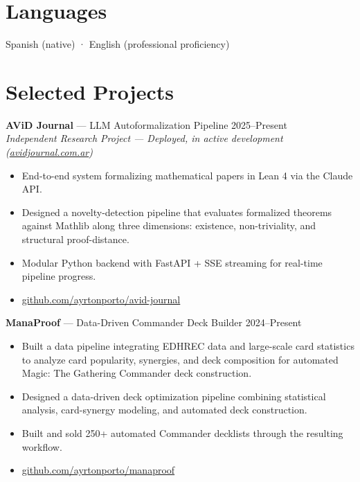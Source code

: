 \documentclass[11pt,a4paper]{article}
\begin{document}
\section{Languages}

Spanish (native) · English (professional proficiency)

\section{Selected Projects}

\textbf{AViD Journal} --- LLM Autoformalization Pipeline \hfill 2025--Present\\
\textit{Independent Research Project --- Deployed, in active development (\href{https://avidjournal.com.ar}{avidjournal.com.ar})}

\begin{itemize}
  \item End-to-end system formalizing mathematical papers in Lean 4 via the Claude API.
  \item Designed a novelty-detection pipeline that evaluates formalized theorems against Mathlib along three dimensions: existence, non-triviality, and structural proof-distance.
  \item Modular Python backend with FastAPI + SSE streaming for real-time pipeline progress.
  \item \href{https://github.com/ayrtonporto/avid-journal}{github.com/ayrtonporto/avid-journal}
\end{itemize}

\vspace{0.3em}
\textbf{ManaProof} --- Data-Driven Commander Deck Builder \hfill 2024--Present

\begin{itemize}
  \item Built a data pipeline integrating EDHREC data and large-scale card statistics to analyze card popularity, synergies, and deck composition for automated Magic: The Gathering Commander deck construction.
  \item Designed a data-driven deck optimization pipeline combining statistical analysis, card-synergy modeling, and automated deck construction.
  \item Built and sold 250+ automated Commander decklists through the resulting workflow.
  \item \href{https://github.com/ayrtonporto/manaproof}{github.com/ayrtonporto/manaproof}
\end{itemize}
\end{document}
